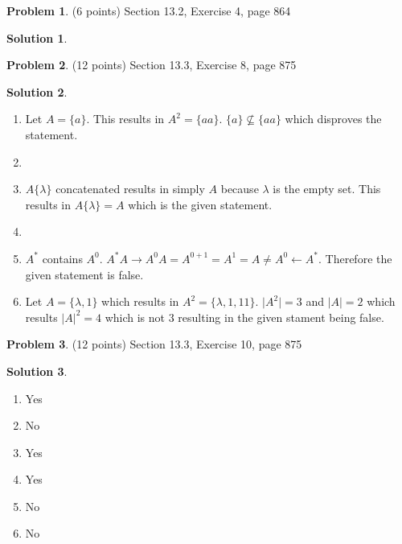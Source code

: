 \documentclass{article}
\theoremstyle{definition}
\newtheorem{problem}{Problem}
\newtheorem*{solution}{Solution}
\begin{document}
\begin{problem} (6 points)
Section 13.2, Exercise 4, page 864
\end{problem}
\begin{solution} \ \\
 
\end{solution}

\begin{problem} (12 points)
Section 13.3, Exercise 8, page 875
\end{problem}
\begin{solution} \ \\
\begin{enumerate}
  \item Let $ A = \{ a \} $. This results in $A^2 = \{ aa \}$. $\{ a \} \nsubseteq \{ aa \} $ which disproves the statement.
  
  \item 
  
  \item $A\{\lambda \}$ concatenated results in simply $A$ because $\lambda$ is the empty set.
  This results in $A\{\lambda \} = A$ which is the given statement.
  
  \item 
  
  \item $A^*$ contains $A^0$. $A^* A \rightarrow A^0 A = A^{0+1} = A^1 = A \neq A^0 \leftarrow A^*$. Therefore the given statement is false.  
  
  \item
  Let $A = \{\lambda, 1 \}$ which results in $A^2 = \{\lambda, 1, 11 \}$. $\vert A^2 \vert = 3$ and $\vert A \vert = 2$ which results $\vert A \vert ^2 = 4$ which is not 3 resulting in the given stament being false.
\end{enumerate}
\end{solution}

\begin{problem} (12 points)
Section 13.3, Exercise 10, page 875
\end{problem}
\begin{solution} \ \\
\begin{enumerate}
  \item Yes
  \item No
  \item Yes
  \item Yes
  \item No
  \item No
\end{enumerate}
\end{solution}
\end{document}
